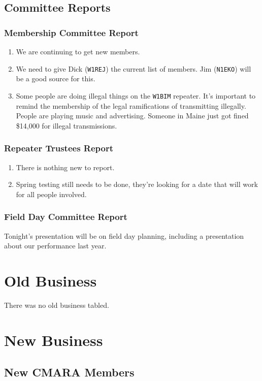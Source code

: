\documentclass[10pt,letterpaper]{article}
\begin{document}
\subsection{Committee Reports}

\subsubsection{Membership Committee Report}
\begin{enumerate}
  \item We are continuing to get new members.
  \item We need to give Dick (\texttt{W1REJ}) the current list of members. Jim (\texttt{N1EKO}) will be a good source for this.
  \item Some people are doing illegal things on the \texttt{W1BIM} repeater. It's important to remind the membership of the legal ramifications of transmitting illegally. People are playing music and advertising. Someone in Maine just got fined \$14,000 for illegal transmissions.
\end{enumerate}

\subsubsection{Repeater Trustees Report}
\begin{enumerate}
  \item There is nothing new to report.
  \item Spring testing still needs to be done, they're looking for a date that will work for all people involved.
\end{enumerate}

\subsubsection{Field Day Committee Report}
Tonight's presentation will be on field day planning, including a presentation about our performance last year.

\section{Old Business}
There was no old business tabled.

\section{New Business}

\subsection{New CMARA Members}
\label{new-cmara-members}
\end{document}
